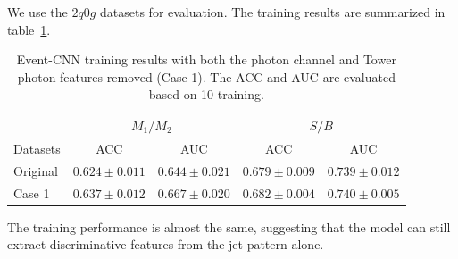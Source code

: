 \documentclass[12pt]{article}
\begin{document}
        We use the $2q0g$ datasets for evaluation. The training results are summarized in table~\ref{tab:CWoLa_event_CNN_training_results_3000_jet_tagging_eta_phi_case1}.
        \begin{table}[htpb]
            \centering
            \caption{Event-CNN training results with both the photon channel and Tower photon features removed (Case 1). The ACC and AUC are evaluated based on 10 training.}
            \label{tab:CWoLa_event_CNN_training_results_3000_jet_tagging_eta_phi_case1}
            \begin{tabular}{l|cc|cc}
                         & \multicolumn{2}{c|}{$M_1 / M_2$}      & \multicolumn{2}{c}{$S / B$}           \\ \hline
                Datasets & ACC               & AUC               & ACC               & AUC               \\ \hline
                Original & $0.624 \pm 0.011$ & $0.644 \pm 0.021$ & $0.679 \pm 0.009$ & $0.739 \pm 0.012$ \\
                Case 1   & $0.637 \pm 0.012$ & $0.667 \pm 0.020$ & $0.682 \pm 0.004$ & $0.740 \pm 0.005$ \\
            \end{tabular}
        \end{table}
        The training performance is almost the same, suggesting that the model can still extract discriminative features from the jet pattern alone.
\end{document}
